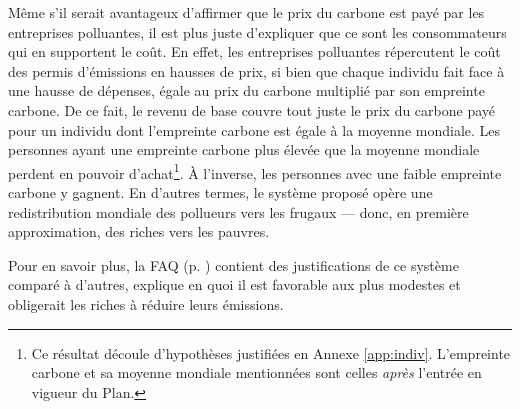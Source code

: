 \documentclass[a5paper,french,openany]{memoir}
\begin{document}
Même s'il serait avantageux %
d'affirmer que le prix du carbone est payé par les entreprises polluantes, il est plus juste d'expliquer que ce sont les consommateurs qui en supportent le coût. 
En effet, les entreprises polluantes répercutent le coût des permis d'émissions en hausses de prix, si bien que chaque individu fait face à une hausse de dépenses, égale au prix du carbone multiplié par son empreinte carbone. De ce fait, le revenu de base couvre tout juste le prix du carbone payé pour un individu dont l'empreinte carbone est égale à la moyenne mondiale. Les personnes ayant une empreinte carbone plus élevée que la moyenne mondiale perdent en pouvoir d'achat\footnote{Ce résultat découle d'hypothèses justifiées en Annexe \ref{app:indiv}. L'empreinte carbone et sa moyenne mondiale mentionnées sont celles \textit{après} l'entrée en vigueur du Plan.
}. À l'inverse, les personnes avec une faible empreinte carbone y gagnent. En d'autres termes, le système proposé opère une redistribution mondiale des pollueurs vers les frugaux --- donc, en première approximation, des riches vers les pauvres. 

Pour en savoir plus, la FAQ (p. \pageref{q:riches}) contient des justifications de ce système comparé à d'autres, explique en quoi il est favorable aux plus modestes et obligerait les riches à réduire leurs émissions.
\end{document}
